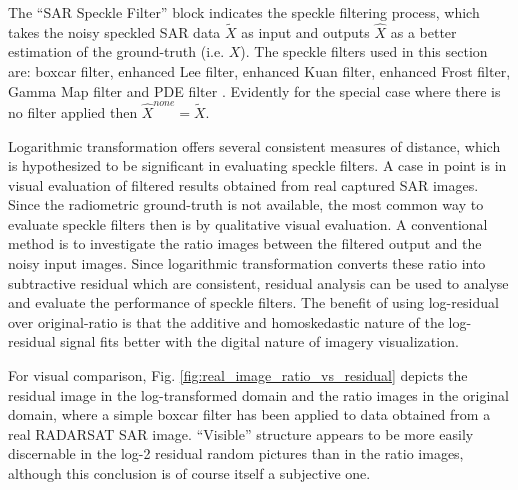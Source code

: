 The ``SAR Speckle Filter'' block indicates the speckle filtering process, 
	which takes the noisy speckled SAR data $\tilde{X}$ as input
	and outputs $\hat{X}$ as a better estimation of the ground-truth (i.e. $X$).
The speckle filters used in this section are: 
	boxcar filter, enhanced Lee filter, enhanced Kuan filter, enhanced Frost filter, Gamma Map filter 
	and PDE filter \cite{You_TIP_2000}.
Evidently for the special case where there is no filter applied then $\hat{X}^{none} = \tilde{X}$.

Logarithmic transformation offers several consistent measures of distance, which is hypothesized to be 
significant in evaluating speckle filters.
	A case in point is in visual evaluation of filtered results obtained from real captured SAR images.
Since the radiometric ground-truth is not available, %
	the most common way to evaluate speckle filters then is by qualitative visual evaluation.
A conventional method is to investigate the ratio images between the filtered output and the noisy input images.
Since logarithmic transformation converts these ratio into subtractive residual which are consistent, residual 
analysis can be used to analyse and evaluate the performance of speckle filters.
The benefit of using log-residual over original-ratio is that the additive and homoskedastic nature of the log-residual signal fits better with the digital nature of imagery visualization.

For visual comparison, Fig. \ref{fig:real_image_ratio_vs_residual} depicts the residual image in the log-transformed domain 
and the ratio images in the original domain, where a simple boxcar filter has been applied to data obtained from a 
real RADARSAT SAR image.
``Visible'' structure appears to be more easily discernable in the log-2 residual random pictures than in 
the ratio images, although this conclusion is of course itself a subjective one.


